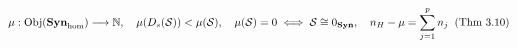 \documentclass[preview]{standalone}
\begin{document}
\begin{align*}
\special{dvisvgm:raw <g id='unique000'>}\mu: \operatorname{Obj}(\mathbf{Syn}_{\text{hom}}) \longrightarrow \mathbb{N}, \quad \mu(D_s(\mathcal{S})) < \mu(\mathcal{S}), \quad \mu(\mathcal{S})=0 \iff \mathcal{S}\cong 0_{\mathbf{Syn}}, \quad n_H - \mu = \sum_{j=1}^p n_j\;\; (\text{Thm 3.10})\special{dvisvgm:raw </g>}
\end{align*}
\end{document}
